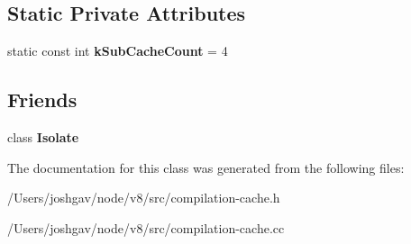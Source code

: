 \subsection*{Static Private Attributes}
\begin{DoxyCompactItemize}
\item 
static const int {\bfseries k\+Sub\+Cache\+Count} = 4\hypertarget{classv8_1_1internal_1_1_compilation_cache_a1037faffbd0741f10266700d6aa952ac}{}\label{classv8_1_1internal_1_1_compilation_cache_a1037faffbd0741f10266700d6aa952ac}

\end{DoxyCompactItemize}
\subsection*{Friends}
\begin{DoxyCompactItemize}
\item 
class {\bfseries Isolate}\hypertarget{classv8_1_1internal_1_1_compilation_cache_aba4f0964bdacf2bbf62cf876e5d28d0a}{}\label{classv8_1_1internal_1_1_compilation_cache_aba4f0964bdacf2bbf62cf876e5d28d0a}

\end{DoxyCompactItemize}


The documentation for this class was generated from the following files\+:\begin{DoxyCompactItemize}
\item 
/\+Users/joshgav/node/v8/src/compilation-\/cache.\+h\item 
/\+Users/joshgav/node/v8/src/compilation-\/cache.\+cc\end{DoxyCompactItemize}
